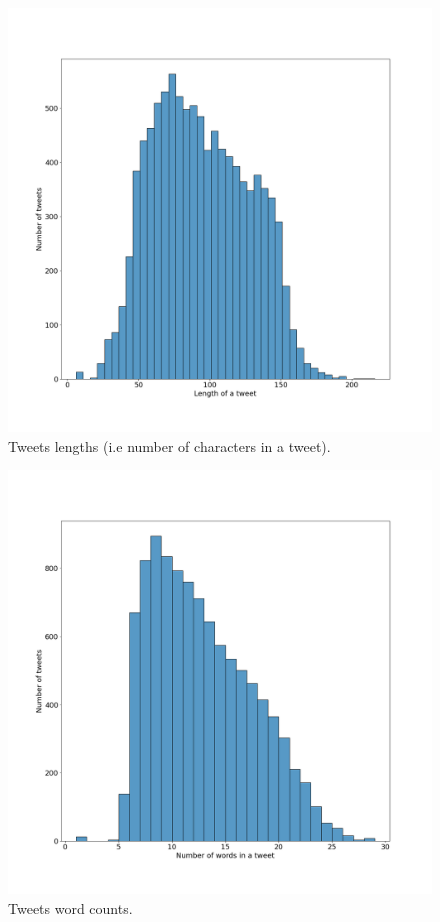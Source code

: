 \documentclass[a4paper]{article}
\begin{document}
\begin{figure}[H]
\centering
\includegraphics[width=\textwidth]{plots/tweet_lengths_plot.png}
\caption{Tweets lengths (i.e number of characters in a tweet).}
\label{fig:tweet_lengths_histogram}
\end{figure}

\begin{figure}[H]
\centering
\includegraphics[width=\textwidth]{plots/tweet_word_counts_plot.png}
\caption{Tweets word counts.}
\label{fig:word_counts_histogram}
\end{figure}
\end{document}
